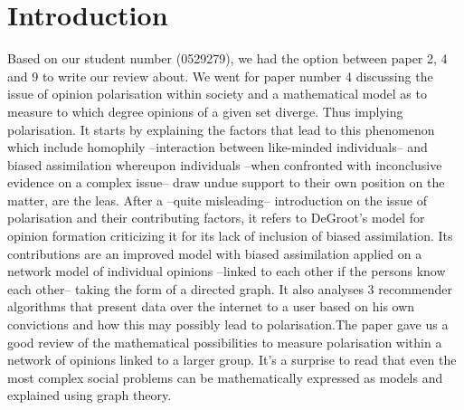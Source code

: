 \documentclass[14]{article}
\begin{document}
\author{\textbf{Faculty of Sciences and Bio-Engineering Sciences}\\[2\baselineskip]\newline\textbf{Arthur Chomé - 0529279}}

\date{ \LARGE Assignment 3: Review}
\title{\vspace{-6cm}}%

\maketitle

\section{Introduction}
Based on our student number (0529279), we had the option between paper 2, 4 and 9 to write our review about. We went for paper number 4\cite{dandekar2013biased} discussing the issue of opinion polarisation within society and a mathematical model as to measure to which degree opinions of a given set diverge. Thus implying polarisation. 
\newline 
It starts by explaining the factors that lead to this phenomenon which include homophily --interaction between like-minded individuals-- and biased assimilation whereupon individuals --when confronted with inconclusive evidence on a complex issue-- draw undue support to their own position on the matter, are the leas. After a --quite misleading-- introduction on the issue of polarisation and their contributing factors, it refers to DeGroot's model\cite{degroot1974reaching} for opinion formation criticizing it for its lack of inclusion of biased assimilation. Its contributions are an improved model with biased assimilation applied on a network model of individual opinions --linked to each other if the persons know each other-- taking the form of a directed graph. It also analyses 3 recommender algorithms that present data over the internet to a user based on his own convictions and how this may possibly lead to polarisation.The paper gave us a good review of the mathematical possibilities to measure polarisation within a network of opinions linked to a larger group. It's a surprise to read that even the most complex social problems can be mathematically expressed as models and explained using graph theory.
\end{document}
